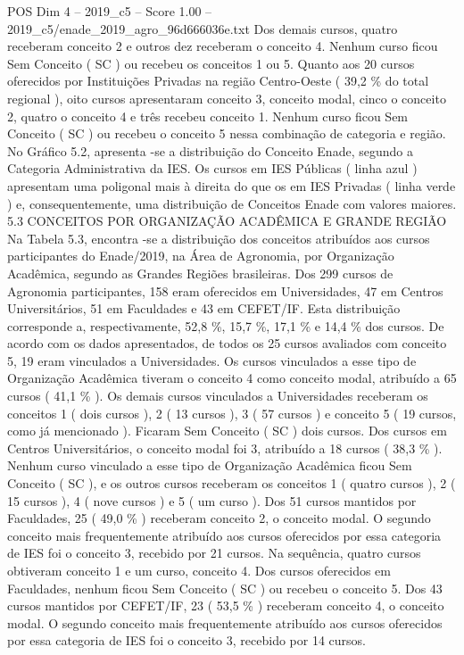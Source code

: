 \begin{textsample}{POS Dim 4 – 2019\_c5 – Score 1.00 – 2019\_c5/enade\_2019\_agro\_96d666036e.txt}
Dos demais cursos, quatro receberam conceito 2 e outros dez receberam o conceito 4.
Nenhum curso ficou Sem Conceito ( SC ) ou recebeu os conceitos 1 ou 5.
Quanto aos 20 cursos oferecidos por Instituições Privadas na região Centro-Oeste ( 39,2 \% do total regional ), oito cursos apresentaram conceito 3, conceito modal, cinco o conceito 2, quatro o conceito 4 e três recebeu conceito 1.
Nenhum curso ficou Sem Conceito ( SC ) ou recebeu o conceito 5 nessa combinação de categoria e região.
No Gráfico 5.2, apresenta -se a distribuição do Conceito Enade, segundo a Categoria Administrativa da IES.
Os cursos em IES Públicas ( linha azul ) apresentam uma poligonal mais à direita do que os em IES Privadas ( linha verde ) e, consequentemente, uma distribuição de Conceitos Enade com valores maiores. 5.3 CONCEITOS POR ORGANIZAÇÃO ACADÊMICA E GRANDE REGIÃO Na Tabela 5.3, encontra -se a distribuição dos conceitos atribuídos aos cursos participantes do Enade/2019, na Área de Agronomia, por Organização Acadêmica, segundo as Grandes Regiões brasileiras.
Dos 299 cursos de Agronomia participantes, 158 eram oferecidos em Universidades, 47 em Centros Universitários, 51 em Faculdades e 43 em CEFET/IF.
Esta distribuição corresponde a, respectivamente, 52,8 \%, 15,7 \%, 17,1 \% e 14,4 \% dos cursos.
De acordo com os dados apresentados, de todos os 25 cursos avaliados com conceito 5, 19 eram vinculados a Universidades.
Os cursos vinculados a esse tipo de Organização Acadêmica tiveram o conceito 4 como conceito modal, atribuído a 65 cursos ( 41,1 \% ).
Os demais cursos vinculados a Universidades receberam os conceitos 1 ( dois cursos ), 2 ( 13 cursos ), 3 ( 57 cursos ) e conceito 5 ( 19 cursos, como já mencionado ).
Ficaram Sem Conceito ( SC ) dois cursos.
Dos cursos em Centros Universitários, o conceito modal foi 3, atribuído a 18 cursos ( 38,3 \% ).
Nenhum curso vinculado a esse tipo de Organização Acadêmica ficou Sem Conceito ( SC ), e os outros cursos receberam os conceitos 1 ( quatro cursos ), 2 ( 15 cursos ), 4 ( nove cursos ) e 5 ( um curso ).
Dos 51 cursos mantidos por Faculdades, 25 ( 49,0 \% ) receberam conceito 2, o conceito modal.
O segundo conceito mais frequentemente atribuído aos cursos oferecidos por essa categoria de IES foi o conceito 3, recebido por 21 cursos.
Na sequência, quatro cursos obtiveram conceito 1 e um curso, conceito 4.
Dos cursos oferecidos em Faculdades, nenhum ficou Sem Conceito ( SC ) ou recebeu o conceito 5.
Dos 43 cursos mantidos por CEFET/IF, 23 ( 53,5 \% ) receberam conceito 4, o conceito modal.
O segundo conceito mais frequentemente atribuído aos cursos oferecidos por essa categoria de IES foi o conceito 3, recebido por 14 cursos.

\end{textsample}
